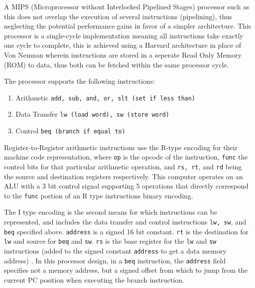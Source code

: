 A MIPS (Microprocessor without Interlocked Pipelined Stages) processor such as this does not overlap the execution of several instructions (pipelining), thus neglecting the potential performance gains in favor of a simpler architecture. This processor is a single-cycle implementation meaning all instructions take exactly one cycle to complete, this is achieved using a Harvard architecture in place of Von Neuman wherein instructions are stored in a seperate Read Only Memory (ROM) to data, thus both can be fetched within the same processor cycle. 

The processor supports the following instructions:
\begin{enumerate}
    \item Arithmetic \texttt{add, sub, and, or, slt (set if less than)}
    \item Data Transfer \texttt{lw (load word), sw (store word)}
    \item Control \texttt{beq (branch if equal to)}
\end{enumerate} 
Register-to-Register arithmetic instructions use the R-type encoding for their machine code representation, where \texttt{op} is the opcode of the instruction, \texttt{func} the control bits for that particular arithmetic operation, and \texttt{rs, rt}, and \texttt{rd} being the source and destination registers respectively. This computer operates on an ALU with a 3 bit control signal supporting 5 operations that directly correspond to the \texttt{func} portion of an R type instructions binary encoding. 

\bigskip


\bigskip

The I type encoding is the second means for which instructions can be represented, and includes the data transfer and control instructions \texttt{lw, sw}, and \texttt{beq} specified above. \texttt{address} is a signed 16 bit constant. \texttt{rt} is the destination for \texttt{lw} and source for \texttt{beq} and \texttt{sw}. \texttt{rs} is the base register for the \texttt{lw} and \texttt{sw} instructions (added to the signed constant \texttt{address} to get a data memory address) \textcite{MIPS-uw}. In this processor design, in a \texttt{beq} instruction, the \texttt{address} field specifies not a memory address, but a signed offset from which to jump from the current PC position when executing the branch instruction.

